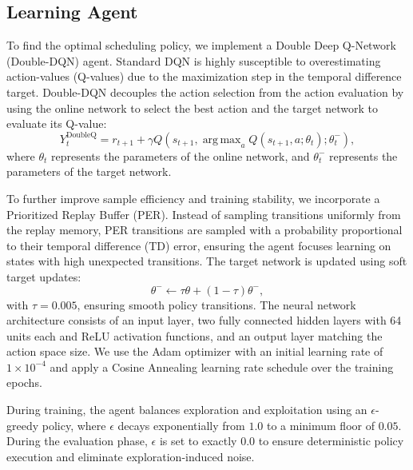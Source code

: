 \documentclass[runningheads,a4paper]{llncs}
\begin{document}
\subsection{Learning Agent}
To find the optimal scheduling policy, we implement a Double Deep Q-Network (Double-DQN) agent. Standard DQN is highly susceptible to overestimating action-values (Q-values) due to the maximization step in the temporal difference target. Double-DQN decouples the action selection from the action evaluation by using the online network to select the best action and the target network to evaluate its Q-value:
\begin{equation}
Y_t^{\text{DoubleQ}} = r_{t+1} + \gamma Q\left(s_{t+1}, \operatorname{arg\,max}_{a} Q(s_{t+1}, a; \theta_t); \theta_t^{-} \right),
\end{equation}
where $\theta_t$ represents the parameters of the online network, and $\theta_t^{-}$ represents the parameters of the target network.

To further improve sample efficiency and training stability, we incorporate a Prioritized Replay Buffer (PER). Instead of sampling transitions uniformly from the replay memory, PER transitions are sampled with a probability proportional to their temporal difference (TD) error, ensuring the agent focuses learning on states with high unexpected transitions. The target network is updated using soft target updates:
\begin{equation}
\theta^{-} \leftarrow \tau \theta + (1-\tau)\theta^{-},
\end{equation}
with $\tau = 0.005$, ensuring smooth policy transitions. The neural network architecture consists of an input layer, two fully connected hidden layers with 64 units each and ReLU activation functions, and an output layer matching the action space size. We use the Adam optimizer with an initial learning rate of $1\times10^{-4}$ and apply a Cosine Annealing learning rate schedule over the training epochs. 

During training, the agent balances exploration and exploitation using an $\epsilon$-greedy policy, where $\epsilon$ decays exponentially from $1.0$ to a minimum floor of $0.05$. During the evaluation phase, $\epsilon$ is set to exactly $0.0$ to ensure deterministic policy execution and eliminate exploration-induced noise.
\end{document}

